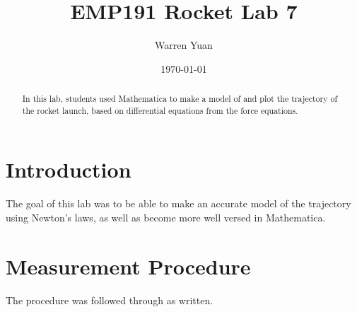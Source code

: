 \documentclass[a4paper,11pt]{article}
\title{\vspace{-2.0cm}EMP191 Rocket Lab 7}
\author{Warren Yuan}
\date{\today}
\begin{document}
\maketitle

\begin{abstract}
 {In this lab, students used Mathematica to make a model of and plot the trajectory of the rocket launch, based on differential equations from the force equations.}
\end{abstract}

\section{Introduction}
{\quad The goal of this lab was to be able to make an accurate model of the trajectory using Newton's laws, as well as become more well versed in Mathematica.}

\section{Measurement Procedure}
{\quad The procedure was followed through as written.}

\end{document}
